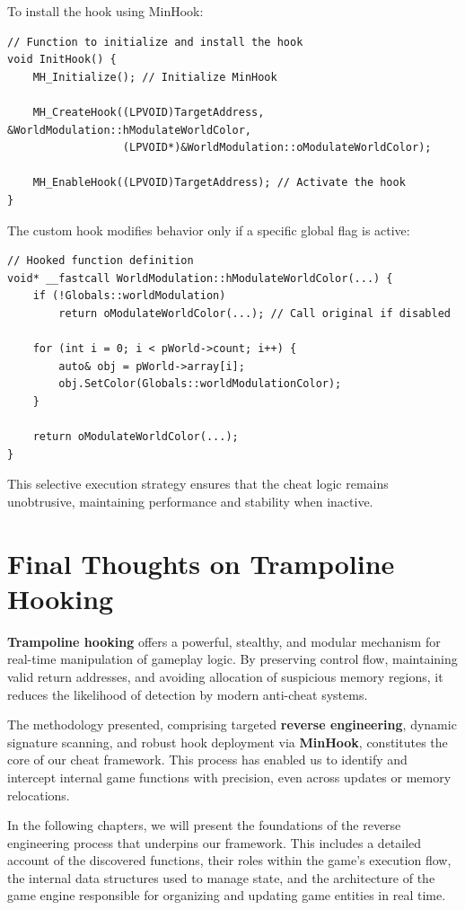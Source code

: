 To install the hook using MinHook:

\begin{lstlisting}[style=cppstyle]
// Function to initialize and install the hook
void InitHook() {
    MH_Initialize(); // Initialize MinHook

    MH_CreateHook((LPVOID)TargetAddress, &WorldModulation::hModulateWorldColor, 
                  (LPVOID*)&WorldModulation::oModulateWorldColor);

    MH_EnableHook((LPVOID)TargetAddress); // Activate the hook
}
\end{lstlisting}


\newpage

The custom hook modifies behavior only if a specific global flag is active:

\begin{lstlisting}[style=cppstyle]
// Hooked function definition
void* __fastcall WorldModulation::hModulateWorldColor(...) {
    if (!Globals::worldModulation)
        return oModulateWorldColor(...); // Call original if disabled

    for (int i = 0; i < pWorld->count; i++) {
        auto& obj = pWorld->array[i];
        obj.SetColor(Globals::worldModulationColor);
    }

    return oModulateWorldColor(...);
}
\end{lstlisting}

This selective execution strategy ensures that the cheat logic remains unobtrusive, maintaining performance and stability when inactive.

\section{Final Thoughts on Trampoline Hooking}

\textbf{Trampoline hooking} offers a powerful, stealthy, and modular mechanism for real-time manipulation of gameplay logic.  
By preserving control flow, maintaining valid return addresses, and avoiding allocation of suspicious memory regions, it reduces the likelihood of detection by modern anti-cheat systems.

The methodology presented, comprising targeted \textbf{reverse engineering}, dynamic signature scanning, and robust hook deployment via \textbf{MinHook}, constitutes the core of our cheat framework.  
This process has enabled us to identify and intercept internal game functions with precision, even across updates or memory relocations.


In the following chapters, we will present the foundations of the reverse engineering process that underpins our framework. This includes a detailed account of the discovered functions, their roles within the game's execution flow, the internal data structures used to manage state, and the architecture of the game engine responsible for organizing and updating game entities in real time.